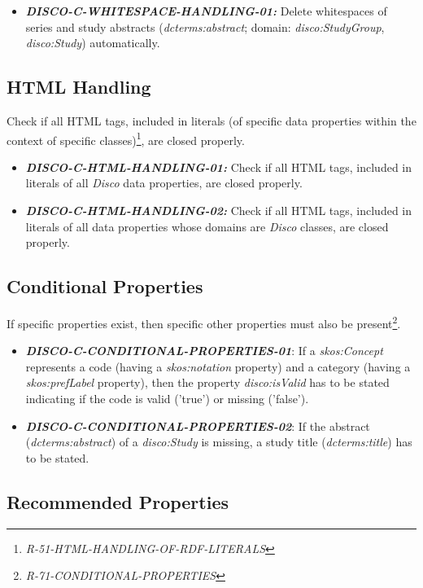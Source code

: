 \documentclass{llncs}
\begin{document}
\begin{itemize}
	\item \textbf{{\em DISCO-C-WHITESPACE-HANDLING-01:}} Delete whitespaces of series and study abstracts (\emph{dcterms:abstract}; domain: \emph{disco:StudyGroup}, \emph{disco:Study}) automatically.
\end{itemize}

\subsection{HTML Handling}

Check if all HTML tags, included in literals (of specific data properties within the context of specific classes)\footnote{\emph{R-51-HTML-HANDLING-OF-RDF-LITERALS}}, are closed properly.

\begin{itemize}
	\item \textbf{{\em DISCO-C-HTML-HANDLING-01:}} Check if all HTML tags, included in literals of all \emph{Disco} data properties, are closed properly.
	\item \textbf{{\em DISCO-C-HTML-HANDLING-02:}} Check if all HTML tags, included in literals of all data properties whose domains are \emph{Disco} classes, are closed properly.
\end{itemize}


\subsection{Conditional Properties}

If specific properties exist, then specific other properties must also be present\footnote{{\em R-71-CONDITIONAL-PROPERTIES}}.

\begin{itemize}
	\item \textbf{{\em DISCO-C-CONDITIONAL-PROPERTIES-01}}:
  If a {\em skos:Concept} represents a code (having a {\em skos:notation} property) and a category (having a {\em skos:prefLabel} property), 
then the property {\em disco:isValid} has to be stated indicating if the code is valid ('true') or missing ('false').
	\item \textbf{{\em DISCO-C-CONDITIONAL-PROPERTIES-02}}:
	If the abstract (\emph{dcterms:abstract}) of a \emph{disco:Study} is missing, a study title (\emph{dcterms:title}) has to be stated.
\end{itemize}

\subsection{Recommended Properties}
\end{document}
